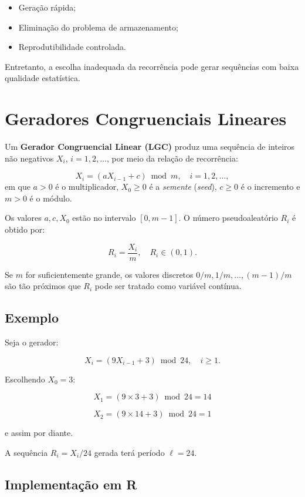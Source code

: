 \documentclass[
  letterpaper,
  DIV=11,
  numbers=noendperiod]{scrreprt}
\providecommand{\tightlist}{%
  \setlength{\itemsep}{0pt}\setlength{\parskip}{0pt}}\usepackage{longtable,booktabs,array}
\begin{document}
\begin{itemize}
\tightlist
\item
  Geração rápida;
\item
  Eliminação do problema de armazenamento;
\item
  Reprodutibilidade controlada.
\end{itemize}

Entretanto, a escolha inadequada da recorrência pode gerar sequências
com baixa qualidade estatística.

\section{Geradores Congruenciais
Lineares}\label{geradores-congruenciais-lineares}

Um \textbf{Gerador Congruencial Linear (LGC)} produz uma sequência de
inteiros não negativos \(X_i\), \(i = 1, 2, \ldots\), por meio da
relação de recorrência:

\[X_i = (a X_{i-1} + c) \bmod m, \quad i = 1, 2, \ldots,\] em que
\(a > 0\) é o multiplicador, \(X_0 \ge 0\) é a \emph{semente}
(\emph{seed}), \(c \ge 0\) é o incremento e \(m > 0\) é o módulo.

Os valores \(a, c, X_0\) estão no intervalo \([0, m-1]\). O número
pseudoaleatório \(R_i\) é obtido por:

\[R_i = \frac{X_i}{m}, \quad R_i \in (0,1).\]

Se \(m\) for suficientemente grande, os valores discretos
\(0/m, 1/m, \ldots, (m-1)/m\) são tão próximos que \(R_i\) pode ser
tratado como variável contínua.

\subsection{Exemplo}\label{exemplo}

Seja o gerador:

\[X_i = (9 X_{i-1} + 3) \bmod 24, \quad i \geq 1.\]

Escolhendo \(X_0 = 3\):

\[X_1 = (9 \times 3 + 3) \bmod 24 = 14\]

\[X_2 = (9 \times 14 + 3) \bmod 24 = 1\]

e assim por diante.

A sequência \(R_i = X_i / 24\) gerada terá período \(\ell = 24\).

\subsection{Implementação em R}\label{implementauxe7uxe3o-em-r}
\end{document}
